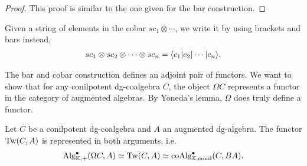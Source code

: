 \documentclass[../thesis.tex]{subfiles}
\begin{document}
            \begin{proof}
                This proof is similar to the one given for the bar construction.
            \end{proof}

            Given a string of elements in the cobar $sc_1 \otimes \cdots$, we write it by using brackets and bars instead,
            \begin{align*}
                sc_1 \otimes sc_2 \otimes \cdots \otimes sc_n = \langle c_1 | c_2 | \cdots | c_n \rangle\tt{.}
            \end{align*}

            The bar and cobar construction defines an adjoint pair of functors. We want to show that for any conilpotent dg-coalgebra $C$, the object $\Omega C$ represents a functor in the category of augmented algebras. By Yoneda's lemma, $\Omega$ does truly define a functor.

            \begin{thm}\label{thm: cobar-bar-adj}
                Let $C$ be a conilpotent dg-coalgebra and $A$ an augmented dg-algebra. The functor $\tt{Tw}(C,A)$ is represented in both arguments, i.e.
                \begin{align*}
                    \tt{Alg}_{\mathbb{K},+}^\bullet(\Omega C, A)\simeq \tt{Tw}(C, A) \simeq \tt{coAlg}_{\mathbb{K},\tt{conil}}^\bullet(C, BA)\text{.}
                \end{align*}
            \end{thm}
\end{document}
